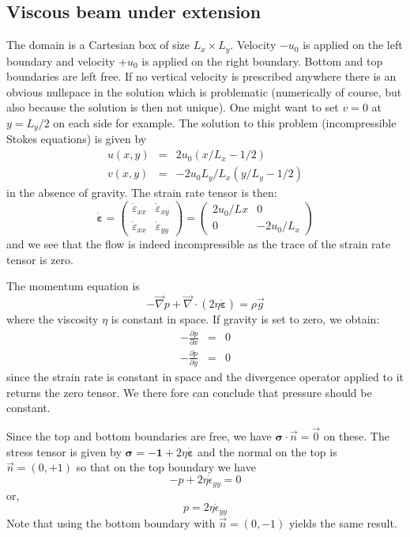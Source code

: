 \subsection{Viscous beam under extension}

The domain is a Cartesian box of size $L_x \times L_y$. 
Velocity $-u_0$ is applied on the left boundary and 
velocity $+u_0$ is applied on the right boundary. 
Bottom and top boundaries are left free. 
If no vertical velocity is prescribed anywhere there is an obvious nullspace 
in the solution which is problematic (numerically of course, but also 
because the solution is then not unique). One might want to set $v=0$ at $y=L_y/2$
on each side for example. 
The solution to this problem (incompressible Stokes equations) is given by
\begin{eqnarray}
u(x,y)&=&2u_0(x/L_x-1/2)\\
v(x,y)&=&-2 u_0 L_y/L_x (y/L_y-1/2)
\end{eqnarray}
in the absence of gravity. The strain rate tensor is then:
\[
\dot{\bm \varepsilon} =
\left(
\begin{array}{cc}
\dot{\varepsilon}_{xx} & \dot{\varepsilon}_{xy} \\
\dot{\varepsilon}_{xx} & \dot{\varepsilon}_{yy} 
\end{array}
\right)
=
\left(
\begin{array}{cc}
2 u_0 /Lx & 0 \\
0 & -2 u_0 /L_x 
\end{array}
\right)
\]
and we see that the flow is indeed incompressible as the trace 
of the strain rate tensor is zero. 

The momentum equation is 
\[
-\vec\nabla p + \vec\nabla \cdot (2 \eta \dot{\bm\varepsilon}) = \rho \vec g
\]
where the viscosity $\eta$ is constant in space. 
If gravity is set to zero, we obtain:
\begin{eqnarray}
-\frac{\partial p}{\partial x} &=& 0 \\
-\frac{\partial p}{\partial y} &=& 0 
\end{eqnarray}
since the strain rate is constant in space and the divergence operator applied to it returns 
the zero tensor. We there fore can conclude that pressure should be constant. 

Since the top and bottom boundaries are free, we have ${\bm \sigma}\cdot \vec{n} = \vec{0}$ on these.
The stress tensor is given by ${\bm \sigma} = - {\bm 1} + 2 \eta \dot{\bm \varepsilon}$ and the normal on the 
top is $\vec{n}=(0,+1)$ so that on the top boundary we have
\[
- p + 2 \eta \dot{\epsilon}_{yy} = 0
\]
or, 
\[
p= 2 \eta \dot{\epsilon}_{yy} 
\]
Note that using the bottom boundary with $\vec{n}=(0,-1)$ yields the same result.


